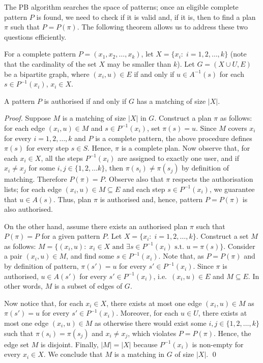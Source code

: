 \documentclass[runningheads,proof]{llncs}
\begin{document}
The PB algorithm searches the space of patterns; once an eligible complete pattern $P$ is found, we need to check if it is valid and, if it is, then to find a plan $\pi$ such that $P = P(\pi)$.
The following theorem allows us to address these two questions efficiently.

For a complete pattern $P = (x_1, x_2, \ldots, x_k)$, let $X = \{ x_i :\; i = 1, 2, \ldots, k \}$ (note that the cardinality of the set $X$ may be smaller than $k$).
Let $G = (X \cup U, E)$ be a bipartite graph, where $(x_i, u) \in E$ if and only if $u \in A^{-1}(s)$ for each $s \in P^{-1}(x_i)$, $x_i\in X$. 



\begin{theorem}
\label{th:matching}
 A pattern $P$ is authorised if and only if $G$ has a matching of size $|X|$.
\end{theorem}
\begin{proof}
Suppose $M$ is a matching of size $|X|$ in $G$. 
Construct a plan $\pi$ as follows: for each edge $(x_i, u) \in M$ and $s \in P^{-1}(x_i)$, set $\pi(s) = u$.  
Since $M$ covers $x_i$ for every $i = 1, 2, \ldots, k$ and $P$ is a complete pattern, the above procedure defines $\pi(s)$ for every step $s \in S$.
Hence, $\pi$ is a complete plan.
Now observe that, for each $x_i \in X$, all the steps $P^{-1}(x_i)$ are assigned to exactly one user, and if $x_i \neq x_j$ for some $i, j \in \{ 1, 2, \ldots k \}$, then $\pi(s_i) \neq \pi(s_j)$ by definition of matching.
Therefore $P(\pi) = P$. 
Observe also that $\pi$ respects the authorisation lists; for each edge $(x_i, u) \in M \subseteq E$ and each step $s \in P^{-1}(x_i)$, we guarantee that $u \in A(s)$. 
Thus, plan $\pi$ is authorised and, hence, pattern $P = P(\pi)$ is also authorised.

\smallskip
On the other hand, assume there exists an authorised plan $\pi$ such that $P(\pi) = P$ for a given pattern $P$\@.  
Let $X = \{ x_i :\; i = 1, 2, \ldots, k \}$.  
Construct a set $M$ as follows: $M = \{ (x_i, u) :\; x_i \in X \text{ and } \exists s \in P^{-1}(x_i) \text{ s.t.\ } u = \pi(s) \}$.  
Consider a pair $(x_i, u) \in M$, and find some $s \in P^{-1}(x_i)$.
Note that, as $P = P(\pi)$ and by definition of pattern, $\pi(s') = u$ for every $s' \in P^{-1}(x_i)$.  
Since $\pi$ is authorised, $u \in A(s')$ for every $s' \in P^{-1}(x_i)$, i.e.\ $(x_i, u) \in E$ and $M \subseteq E$.  In other words, $M$ is a subset of edges of $G$.

Now notice that, for each $x_i \in X$, there exists at most one edge $(x_i, u) \in M$ as $\pi(s') = u$ for every $s' \in P^{-1}(x_i)$.  Moreover, for each $u \in U$, there exists at most one edge $(x_i, u) \in M$ as otherwise there would exist some $i, j \in \{ 1, 2, \ldots, k \}$ such that $\pi(s_i) = \pi(s_j)$ and $x_i \neq x_j$, which violates $P = P(\pi)$.  Hence, the edge set $M$ is disjoint.  Finally, $|M| = |X|$ because $P^{-1}(x_i)$ is non-empty for every $x_i \in X$.  We conclude that $M$ is a matching in $G$ of size $|X|$.
\qed
\end{proof}
\end{document}
